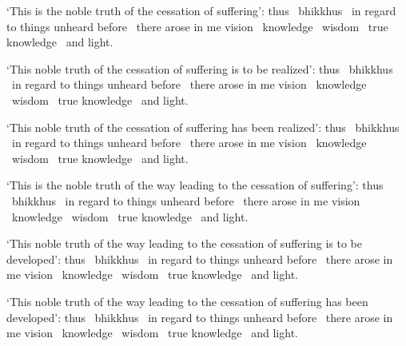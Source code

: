 \begin{english-hang}
  `This is the noble truth of the cessation of suffering': thus \breathmark\ bhikkhus \breathmark\ in regard to things unheard before \breathmark\ there arose in me vision \breathmark\ knowledge \breathmark\ wisdom \breathmark\ true knowledge \breathmark\ and light.
\end{english-hang}

\begin{english-hang}
  `This noble truth of the cessation of suffering is to be realized': thus \breathmark\ bhikkhus \breathmark\ in regard to things unheard before \breathmark\ there arose in me vision \breathmark\ knowledge \breathmark\ wisdom \breathmark\ true knowledge \breathmark\ and light.
\end{english-hang}

\begin{english-hang}
  `This noble truth of the cessation of suffering has been realized': thus \breathmark\ bhikkhus \breathmark\ in regard to things unheard before \breathmark\ there arose in me vision \breathmark\ knowledge \breathmark\ wisdom \breathmark\ true knowledge \breathmark\ and light.
\end{english-hang}

\begin{english-hang}
  `This is the noble truth of the way leading to the cessation of suffering': thus \breathmark\ bhikkhus \breathmark\ in regard to things unheard before \breathmark\ there arose in me vision \breathmark\ knowledge \breathmark\ wisdom \breathmark\ true knowledge \breathmark\ and light.
\end{english-hang}

\begin{english-hang}
  `This noble truth of the way leading to the cessation of suffering is to be developed': thus \breathmark\ bhikkhus \breathmark\ in regard to things unheard before \breathmark\ there arose in me vision \breathmark\ knowledge \breathmark\ wisdom \breathmark\ true knowledge \breathmark\ and light.
\end{english-hang}

\begin{english-hang}
  `This noble truth of the way leading to the cessation of suffering has been developed': thus \breathmark\ bhikkhus \breathmark\ in regard to things unheard before \breathmark\ there arose in me vision \breathmark\ knowledge \breathmark\ wisdom \breathmark\ true knowledge \breathmark\ and light.
\end{english-hang}

